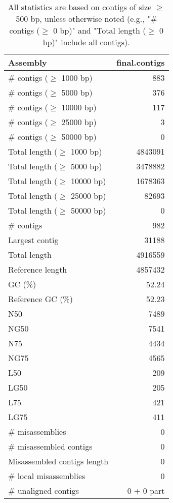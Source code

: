 \documentclass[12pt,a4paper]{article}
\begin{document}
\begin{table}[ht]
\begin{center}
\caption{All statistics are based on contigs of size $\geq$ 500 bp, unless otherwise noted (e.g., "\# contigs ($\geq$ 0 bp)" and "Total length ($\geq$ 0 bp)" include all contigs).}
\begin{tabular}{|l*{1}{|r}|}
\hline
Assembly & final.contigs \\ \hline
\# contigs ($\geq$ 1000 bp) & 883 \\ \hline
\# contigs ($\geq$ 5000 bp) & 376 \\ \hline
\# contigs ($\geq$ 10000 bp) & 117 \\ \hline
\# contigs ($\geq$ 25000 bp) & 3 \\ \hline
\# contigs ($\geq$ 50000 bp) & 0 \\ \hline
Total length ($\geq$ 1000 bp) & 4843091 \\ \hline
Total length ($\geq$ 5000 bp) & 3478882 \\ \hline
Total length ($\geq$ 10000 bp) & 1678363 \\ \hline
Total length ($\geq$ 25000 bp) & 82693 \\ \hline
Total length ($\geq$ 50000 bp) & 0 \\ \hline
\# contigs & 982 \\ \hline
Largest contig & 31188 \\ \hline
Total length & 4916559 \\ \hline
Reference length & 4857432 \\ \hline
GC (\%) & 52.24 \\ \hline
Reference GC (\%) & 52.23 \\ \hline
N50 & 7489 \\ \hline
NG50 & 7541 \\ \hline
N75 & 4434 \\ \hline
NG75 & 4565 \\ \hline
L50 & 209 \\ \hline
LG50 & 205 \\ \hline
L75 & 421 \\ \hline
LG75 & 411 \\ \hline
\# misassemblies & 0 \\ \hline
\# misassembled contigs & 0 \\ \hline
Misassembled contigs length & 0 \\ \hline
\# local misassemblies & 0 \\ \hline
\# unaligned contigs & 0 + 0 part \\ \hline

\end{tabular}
\end{center}
\end{table}
\end{document}
